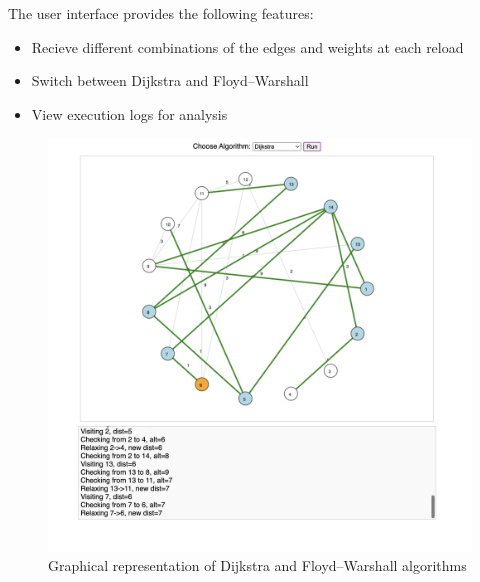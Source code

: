 \documentclass[12pt]{article}
\begin{document}
The user interface provides the following features:
\begin{itemize}
  \item Recieve different combinations of the edges and weights at each reload
  \item Switch between Dijkstra and Floyd–Warshall
  \item View execution logs for analysis
\end{itemize}

\begin{figure}[h]
    \centering
    \includegraphics[width=1\textwidth]{images/site_dijkstra.png}
    \caption{Graphical representation of Dijkstra and Floyd–Warshall algorithms}
    \label{fig:site}
\end{figure}
\end{document}
